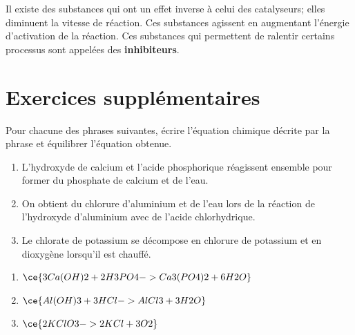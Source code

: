\documentclass[
  11pt,
  a4paper,
  openany]{book}
\providecommand{\tightlist}{%
  \setlength{\itemsep}{0pt}\setlength{\parskip}{0pt}}
\begin{document}
Il existe des substances qui ont un effet inverse à celui des catalyseurs; elles diminuent la vitesse de réaction. Ces substances agissent en augmentant l'énergie d'activation de la réaction. Ces substances qui permettent de ralentir certains processus sont appelées des \textbf{inhibiteurs}.

\section{Exercices supplémentaires}\label{exercices-suppluxe9mentaires-8}

\begin{Exercise}

Pour chacune des phrases suivantes, écrire l'équation chimique décrite par la phrase et équilibrer l'équation obtenue.

\begin{enumerate}
\def\labelenumi{\arabic{enumi}.}
\tightlist
\item
  L'hydroxyde de calcium et l'acide phosphorique réagissent ensemble pour former du phosphate de calcium et de l'eau.
\item
  On obtient du chlorure d'aluminium et de l'eau lors de la réaction de l'hydroxyde d'aluminium avec de l'acide chlorhydrique.
\item
  Le chlorate de potassium se décompose en chlorure de potassium et en dioxygène lorsqu'il est chauffé.
\end{enumerate}

\end{Exercise}

\begin{Answer}

\begin{enumerate}
\def\labelenumi{\arabic{enumi}.}
\item
  \(\ce{3Ca(OH)2 + 2H3PO4 -> Ca3(PO4)2 + 6H2O}\)
\item
  \(\ce{Al(OH)3 + 3HCl -> AlCl3 + 3H2O}\)
\item
  \(\ce{2KClO3 -> 2KCl + 3O2}\)
\end{enumerate}

\end{Answer}

\newpage
\end{document}

